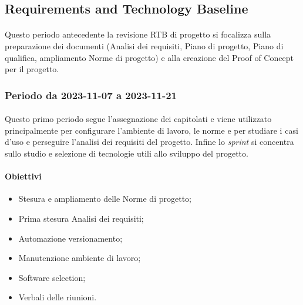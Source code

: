 \documentclass[10pt, a4paper]{article}
\begin{document}
{{{{{{{\subsection{Requirements and Technology Baseline}
\paragraph{}Questo periodo antecedente la revisione RTB di progetto si focalizza sulla preparazione dei documenti (Analisi dei requisiti, Piano di progetto, Piano di qualifica, ampliamento Norme di progetto) e alla creazione del Proof of Concept per il progetto.

\subsubsection{Periodo da 2023-11-07 a 2023-11-21}
\paragraph{}Questo primo periodo segue l'assegnazione dei capitolati e viene utilizzato principalmente per configurare l'ambiente di lavoro, le norme e per studiare i casi d'uso e perseguire l'analisi dei requisiti del progetto. Infine lo \textit{sprint} si concentra sullo studio e selezione di tecnologie utili allo sviluppo del progetto.
\paragraph{Obiettivi}
\begin{itemize}
    \item Stesura e ampliamento delle Norme di progetto;
    \item Prima stesura Analisi dei requisiti;
    \item Automazione versionamento;
    \item Manutenzione ambiente di lavoro;
    \item Software selection;
    \item Verbali delle riunioni.
        
\end{itemize}
\vspace{1em}

}}}}}}}
\end{document}
